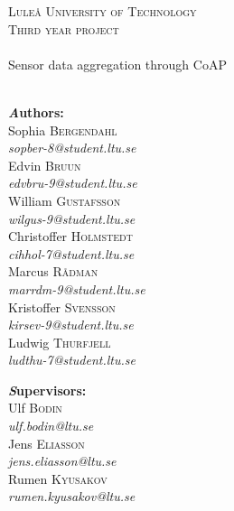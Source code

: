 %
\begin{titlepage}
\begin{center}

\textsc{\LARGE Luleå University of Technology}\\[0.5cm]
\textsc{\Large Third year project}\\[0.5cm]

\HRule \\[0.4cm]
{\huge Sensor data aggregation through CoAP}\\[0.2cm]

\HRule \\[1.5cm]

\begin{minipage}[t]{0.5\textwidth}
\begin{flushleft} \large
{\bfseries \emph Authors:}\\
Sophia \textsc{Bergendahl}\\
\emph{sopber-8@student.ltu.se}\\[0.2cm]
Edvin \textsc{Bruun}\\
\emph{edvbru-9@student.ltu.se}\\[0.2cm]
William \textsc{Gustafsson}\\
\emph{wilgus-9@student.ltu.se}\\[0.2cm]
Christoffer \textsc{Holmstedt}\\
\emph{cihhol-7@student.ltu.se}\\[0.2cm]
Marcus \textsc{Rådman}\\
\emph{marrdm-9@student.ltu.se}\\[0.2cm]
Kristoffer \textsc{Svensson}\\
\emph{kirsev-9@student.ltu.se}\\[0.2cm]
Ludwig \textsc{Thurfjell}\\
\emph{ludthu-7@student.ltu.se}\\
\end{flushleft}
\end{minipage}
\begin{minipage}[t]{0.45\textwidth}
\begin{flushright} \large
{\bfseries \emph Supervisors:} \\
Ulf \textsc{Bodin}\\
\emph{ulf.bodin@ltu.se}\\[0.2cm]
Jens \textsc{Eliasson}\\
\emph{jens.eliasson@ltu.se}\\[0.2cm]
Rumen \textsc{Kyusakov}\\
\emph{rumen.kyusakov@ltu.se}\\[0.2cm]
\end{flushright}
\end{minipage}


\end{center}
\end{titlepage}
